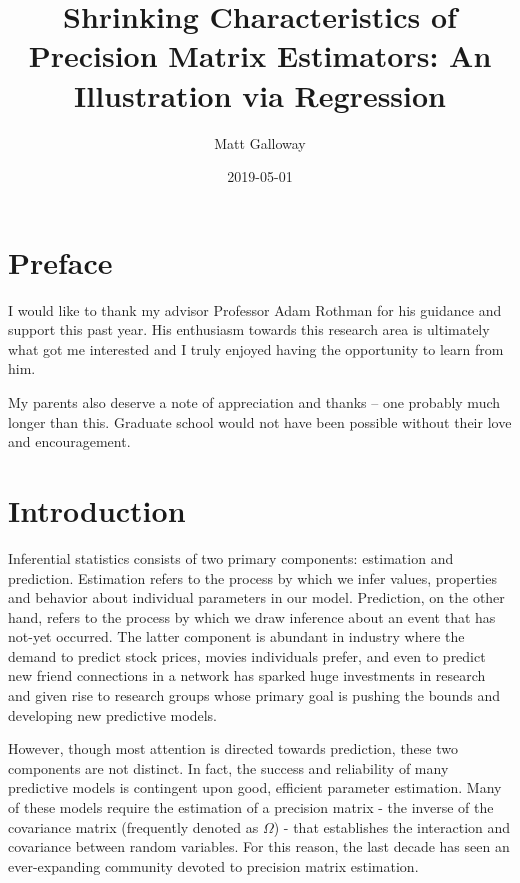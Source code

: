 \documentclass[11pt,]{report}
\title{Shrinking Characteristics of Precision Matrix Estimators: An Illustration via Regression}
\author{Matt Galloway}
\date{2019-05-01}
\theoremstyle{definition}
\theoremstyle{definition}
\theoremstyle{definition}
\theoremstyle{remark}
\begin{document}
\maketitle

{
\hypersetup{linkcolor=}
\setcounter{tocdepth}{1}
\tableofcontents
}
\hypertarget{preface}{%
\chapter*{Preface}\label{preface}}


I would like to thank my advisor Professor Adam Rothman for his guidance and support this past year. His enthusiasm towards this research area is ultimately what got me interested and I truly enjoyed having the opportunity to learn from him.

My parents also deserve a note of appreciation and thanks -- one probably much longer than this. Graduate school would not have been possible without their love and encouragement.

\hypertarget{intro}{%
\chapter{Introduction}\label{intro}}

Inferential statistics consists of two primary components: estimation and prediction. Estimation refers to the process by which we infer values, properties and behavior about individual parameters in our model. Prediction, on the other hand, refers to the process by which we draw inference about an event that has not-yet occurred. The latter component is abundant in industry where the demand to predict stock prices, movies individuals prefer, and even to predict new friend connections in a network has sparked huge investments in research and given rise to research groups whose primary goal is pushing the bounds and developing new predictive models.

However, though most attention is directed towards prediction, these two components are not distinct. In fact, the success and reliability of many predictive models is contingent upon good, efficient parameter estimation. Many of these models require the estimation of a precision matrix - the inverse of the covariance matrix (frequently denoted as \(\Omega\)) - that establishes the interaction and covariance between random variables. For this reason, the last decade has seen an ever-expanding community devoted to precision matrix estimation.
\end{document}

